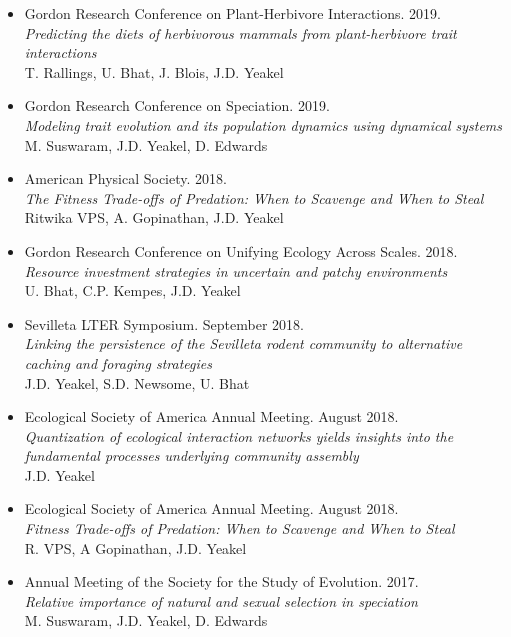 \documentclass[margin,line,12pt]{res}
\begin{document}
\begin{resume}
\begin{itemize}
\item Gordon Research Conference on Plant-Herbivore Interactions. 2019.\\
\emph{Predicting the diets of herbivorous mammals from plant-herbivore trait interactions}\\
T. Rallings, U. Bhat, J. Blois, J.D. Yeakel

\item Gordon Research Conference on Speciation. 2019.\\
\emph{Modeling trait evolution and its population dynamics using dynamical systems}\\
M. Suswaram, J.D. Yeakel, D. Edwards

\item American Physical Society. 2018.\\
\emph{The Fitness Trade-offs of Predation: When to Scavenge and When to Steal}\\
Ritwika VPS, A. Gopinathan, J.D. Yeakel

\item Gordon Research Conference on Unifying Ecology Across Scales. 2018.\\
\emph{Resource investment strategies in uncertain and patchy environments}\\
U. Bhat, C.P. Kempes, J.D. Yeakel

\item Sevilleta LTER Symposium. September 2018.\\
\emph{Linking the persistence of the Sevilleta rodent community to alternative caching and foraging strategies}\\
J.D. Yeakel, S.D. Newsome, U. Bhat

\item Ecological Society of America Annual Meeting. August 2018.\\
\emph{Quantization of ecological interaction networks yields insights into the fundamental processes underlying community assembly}\\
J.D. Yeakel

\item Ecological Society of America Annual Meeting. August 2018.\\
\emph{Fitness Trade-offs of Predation: When to Scavenge and When to Steal}\\
R. VPS, A Gopinathan, J.D. Yeakel

\item Annual Meeting of the Society for the Study of Evolution. 2017.\\
\emph{Relative importance of natural and sexual selection in speciation}\\
M. Suswaram, J.D. Yeakel, D. Edwards


\end{itemize}
\end{resume}
\end{document}
